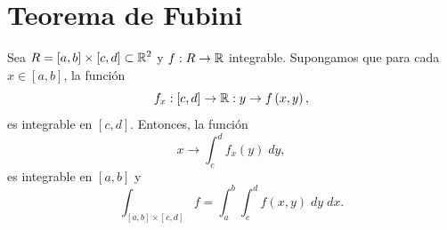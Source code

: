 \section{Teorema de Fubini}
\begin{theorem}
	Sea $\displaystyle R = \left[a, b \right] \times \left[c,d\right] \subset \mathbb{R}^{2} $ y $\displaystyle f : R \to \mathbb{R} $ integrable. Supongamos que para cada $\displaystyle x \in \left[a,b\right]  $, la función 
	\[f_{x} : \left[c,d\right] \to \mathbb{R} : y \to f\left(x,y\right) ,\]
	es integrable en $\displaystyle \left[c,d\right]  $. Entonces, la función 
	\[x \to \int^{d}_{c} f_{x}\left(y\right) \; dy ,\]
	es integrable en $\displaystyle \left[a,b\right]  $ y 
	\[\int _{\left[a,b\right] \times\left[c,d\right] }f = \int^{b}_{a} \int^{d}_{c} f\left(x,y\right) \; dy \; dx .\]
\end{theorem}
